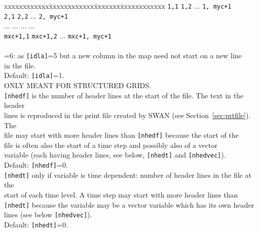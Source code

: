 \documentclass[12pt]{book}
\begin{document}
\begin{tabbing}
                              xxxxxxxxxxxx\=xxxxxxxxxxxx\=xxxxxxx\=xxxxxxxxxxxx \kill
                              {\tt 1,1} \> {\tt 1,2} \> ... \> {\tt 1, myc+1} \\
                              {\tt 2,1} \> {\tt 2,2} \> ... \> {\tt 2, myc+1} \\
                              ...           \> ...           \> ... \> ...              \\
                              {\tt mxc+1,1} \> {\tt mxc+1,2} \> ... \> {\tt mxc+1, myc+1} \\
                              \poptabs
                              \-\\
                       =6: \> as {\tt [idla]}=5 but a new column in the map need not start on a new line\+\\
                              in the file.\-\\
                       \poptabs
                       Default: {\tt [idla]}=1.\\
                       ONLY MEANT FOR STRUCTURED GRIDS.\-\\
{\tt [nhedf]}       \> is the number of header lines at the start of the file. The text in the header\+\\
                       lines is reproduced in the print file created by SWAN (see Section~\ref{sec:prtfile}). The\\
                       file may start with more header lines than {\tt [nhedf]} because the start of the\\
                       file is often also the start of a time step and possibly also of a vector\\
                       variable (each having header lines, see below, {\tt [nhedt]} and {\tt [nhedvec]}).\\
                       Default: {\tt [nhedf]}=0.\-\\
{\tt [nhedt]}       \> only if variable is time dependent: number of header lines in the file at the\+\\
                       start of each time level. A time step may start with more header lines than\\
                       {\tt [nhedt]} because the variable may be a vector variable which has its own header\\
                       lines (see below {\tt [nhedvec]}).\\
                       Default: {\tt [nhedt]}=0.\-\\

\end{tabbing}
\end{document}
